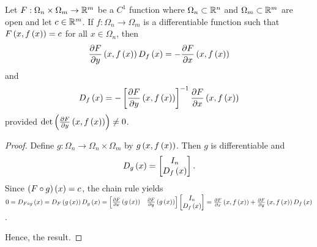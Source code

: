 \begin{proposition}
    Let $F: \Omega_n \times \Omega_m \to \mathbb{R}^m$ be a $C^1$ function where $\Omega_n \subset \mathbb{R}^n$ and $\Omega_m \subset \mathbb{R}^m$ are open and let $c \in \mathbb{R}^m$. If $f: \Omega_n \to \Omega_m$ is a differentiable function such that $F\left(x, f\left(x\right)\right) = c$ for all $x \in \Omega_n$, then
    \[\frac{\partial F}{\partial y}\left(x, f\left(x\right)\right) D_f\left(x\right) = -\frac{\partial F}{\partial x}\left(x, f\left(x\right)\right)\]
    and
    \[D_f\left(x\right) = -\left[\frac{\partial F}{\partial y}\left(x, f\left(x\right)\right)\right]^{-1} \frac{\partial F}{\partial x}\left(x, f\left(x\right)\right)\]
    provided $\det \left(\frac{\partial F}{\partial y}\left(x, f\left(x\right)\right)\right) \neq 0$.
\end{proposition}
\begin{proof}
    Define $g: \Omega_n \to \Omega_n \times \Omega_m$ by $g\left(x, f\left(x\right)\right)$. Then $g$ is differentiable and 
    \[D_g \left(x\right) = \begin{bmatrix} I_n \\ D_f\left(x\right) \end{bmatrix}.\]
    Since $(F \circ g)\left(x\right) = c$, the chain rule yields $0 = D_{F \circ g}\left(x\right) = D_F\left(g\left(x\right)\right) D_g\left(x\right) = \begin{bmatrix} \frac{\partial F}{\partial x}\left(g\left(x\right)\right) & \frac{\partial F}{\partial y}\left(g\left(x\right)\right) \end{bmatrix} \begin{bmatrix} I_n \\ D_f\left(x\right) \end{bmatrix} = \frac{\partial F}{\partial x}\left(x, f\left(x\right)\right) + \frac{\partial F}{\partial y}\left(x, f\left(x\right)\right) D_f\left(x\right)$.

    Hence, the result.
\end{proof}